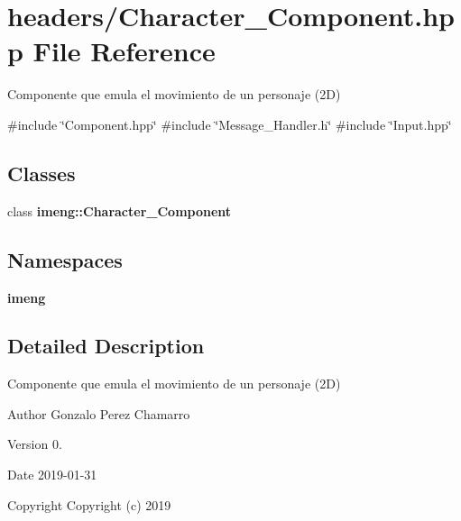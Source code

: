 \section{headers/\+Character\+\_\+\+Component.hpp File Reference}
\label{_character___component_8hpp}


Componente que emula el movimiento de un personaje (2D)  


{\ttfamily \#include \char`\"{}Component.\+hpp\char`\"{}}\newline
{\ttfamily \#include \char`\"{}Message\+\_\+\+Handler.\+h\char`\"{}}\newline
{\ttfamily \#include \char`\"{}Input.\+hpp\char`\"{}}\newline
\subsection*{Classes}
\begin{DoxyCompactItemize}
\item 
class \textbf{ imeng\+::\+Character\+\_\+\+Component}
\end{DoxyCompactItemize}
\subsection*{Namespaces}
\begin{DoxyCompactItemize}
\item 
 \textbf{ imeng}
\end{DoxyCompactItemize}


\subsection{Detailed Description}
Componente que emula el movimiento de un personaje (2D) 

\begin{DoxyAuthor}{Author}
Gonzalo Perez Chamarro 
\end{DoxyAuthor}
\begin{DoxyVersion}{Version}
0. 
\end{DoxyVersion}
\begin{DoxyDate}{Date}
2019-\/01-\/31
\end{DoxyDate}
\begin{DoxyCopyright}{Copyright}
Copyright (c) 2019 
\end{DoxyCopyright}
